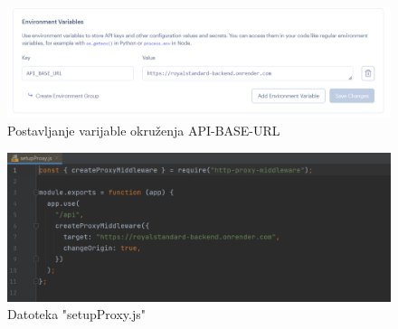		\begin{figure}[H]
			\includegraphics[width=\textwidth]{slike/environmentbaseurl.PNG} 
			\caption{Postavljanje varijable okruženja API-BASE-URL}
			\label{fig:Varijabla okruženja}
		\end{figure}	
	
	\begin{figure}[H]
		\includegraphics[width=\textwidth]{slike/setupproxy.PNG} 
		\caption{Datoteka "setupProxy.js"}
		\label{fig:Proxy}
	\end{figure}	
			\eject 